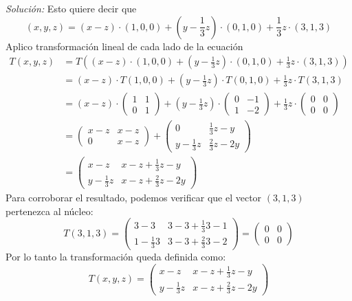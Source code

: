 \documentclass{article}
\newenvironment{solution}
    {\textit{Solución:}}
    {}
\begin{document}
\begin{solution}
        Esto quiere decir que
        \[
        (x,y,z) = (x-z) \cdot (1,0,0) + (y-\frac{1}{3}z) \cdot (0,1,0) + \frac{1}{3}z \cdot (3,1,3) 
        \]
        Aplico transformación lineal de cada lado de la ecuación
        \begin{align*}
        T(x,y,z) &= T((x-z) \cdot (1,0,0) + (y-\frac{1}{3}z) \cdot (0,1,0) + \frac{1}{3}z \cdot (3,1,3)) \\
        &= (x-z) \cdot T(1,0,0) + (y-\frac{1}{3}z) \cdot T(0,1,0) + \frac{1}{3}z \cdot T(3,1,3) \\
        &= (x-z) \cdot \begin{pmatrix} 1 & 1 \\ 0 & 1 \end{pmatrix} + (y-\frac{1}{3}z) \cdot \begin{pmatrix} 0 & -1 \\ 1 & -2 \end{pmatrix} + \frac{1}{3}z \cdot \begin{pmatrix} 0 & 0 \\ 0 & 0 \end{pmatrix} \\
        &= \begin{pmatrix} x-z & x-z \\ 0 & x-z \end{pmatrix} + \begin{pmatrix} 0 &  \frac{1}{3}z - y\\ y - \frac{1}{3}z & \frac{2}{3}z-2y \end{pmatrix} \\
        &= \begin{pmatrix} x-z & x-z + \frac{1}{3}z - y \\ y - \frac{1}{3}z & x-z+ \frac{2}{3}z-2y \end{pmatrix}
        \end{align*}
        Para corroborar el resultado, podemos verificar que el vector $(3,1,3)$ pertenezca al núcleo:
        \[
        T(3,1,3) = \begin{pmatrix} 3-3 & 3-3+\frac{1}{3}3-1 \\ 1-\frac{1}{3}3 & 3-3+\frac{2}{3}3-2 \end{pmatrix} = \begin{pmatrix} 0 & 0 \\ 0 & 0 \end{pmatrix}
        \]
        Por lo tanto la transformación queda definida como:
        \[
        T(x,y,z) = \begin{pmatrix} x-z & x-z + \frac{1}{3}z - y \\ y - \frac{1}{3}z & x-z+ \frac{2}{3}z-2y \end{pmatrix}
        \]
\end{solution}
\end{document}
